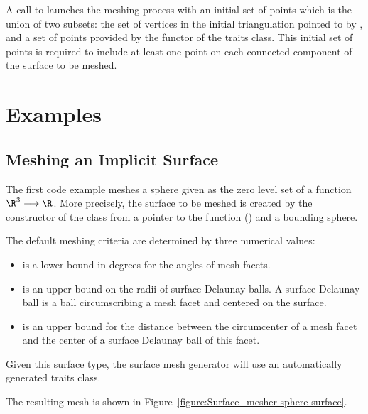 A call to 
 launches 
the meshing process with an initial 
set of points which is the union of two subsets:
the set of vertices in the  initial triangulation pointed to by ,
and a set of points provided by the  functor 
of the traits class. This initial set of points is required 
to include at least one point on each connected component of the surface
to be meshed.


\section{Examples\label{SurfaceMesher_section_example}}

\subsection{Meshing an Implicit Surface}
The first code example meshes a sphere 
given as the zero level set of a function $\R^3 \longrightarrow \R$.
More precisely, 
the surface to be meshed is created 
by the constructor
of the class 
from a pointer to the function ()
and a bounding sphere.

The default meshing criteria are determined  by three numerical
values: 
\begin{itemize}
\item {} is a lower bound in degrees for the angles 
     of mesh facets.
\item {} is an upper bound on the radii of surface Delaunay
balls. A surface Delaunay ball is a ball circumscribing a mesh facet
and centered on the surface. 
\item {} is an upper bound for the distance 
between the circumcenter of a mesh facet and the center of a surface
Delaunay ball of this facet.
\end{itemize}

Given this surface type, the surface mesh generator will use
an automatically generated traits class.

The resulting mesh is shown in 
Figure~\ref{figure:Surface_mesher-sphere-surface}.

